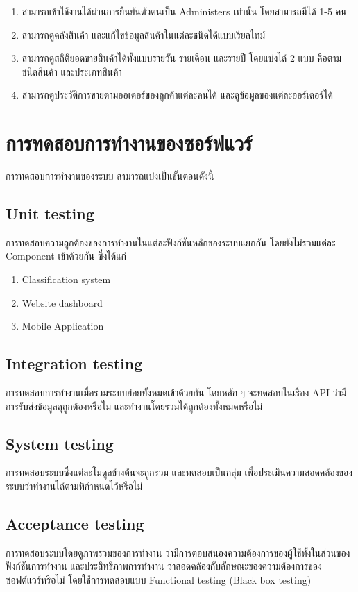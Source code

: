 \begin{enumerate}
  \item สามารถเข้าใช้งานได้ผ่านการยืนยันตัวตนเป็น Administers เท่านั้น โดยสามารถมีได้ 1-5 คน
  \item สามารถดูคลังสินค้า และแก้ไขข้อมูลสินค้าในแต่ละชนิดได้แบบเรียลไทม์
  \item สามารถดูสถิติยอดขายสินค้าได้ทั้งแบบรายวัน รายเดือน และรายปี โดยแบ่งได้ 2 แบบ คือตามชนิดสินค้า และประเภทสินค้า
  \item สามารถดูประวัติการขายตามออเดอร์ของลูกค้าแต่ละคนได้ และดูข้อมูลของแต่ละออร์เดอร์ได้
\end{enumerate}





\section{การทดสอบการทำงานของซอร์ฟแวร์}
การทดสอบการทำงานของระบบ สามารถแบ่งเป็นขั้นตอนดังนี้
\subsection{Unit testing}
การทดสอบความถูกต้องของการทำงานในแต่ละฟังก์ชันหลักของระบบแยกกัน โดยยังไม่รวมแต่ละ Component เข้าด้วยกัน ซึ่งได้แก่
\begin{enumerate}
  \item Classification system
  \item Website dashboard
  \item Mobile Application
\end{enumerate}

\subsection{Integration testing}
การทดสอบการทำงานเมื่อรวมระบบย่อยทั้งหมดเข้าด้วยกัน โดยหลัก ๆ
จะทดสอบในเรื่อง API ว่ามีการรับส่งข้อมูลดุถูกต้องหรือไม่ และทำงานโดยรวมได้ถูกต้องทั้งหมดหรือไม่
\subsection{System testing}
การทดสอบระบบซึ่งแต่ละโมดูลข้างต้นจะถูกรวม และทดสอบเป็นกลุ่ม
เพื่อประเมินความสอดคล้องของระบบว่าทำงานได้ตามที่กำหนดไว้หรือไม่
\subsection{Acceptance testing}
การทดสอบระบบโดยดูภาพรวมของการทำงาน ว่ามีการตอบสนองความต้องการของผู้ใช้ทั้งในส่วนของฟังก์ชันการทำงาน
และประสิทธิภาพการทำงาน ว่าสอดคล้องกับลักษณะของความต้องการของซอฟต์แวร์หรือไม่
โดยใช้การทดสอบแบบ Functional testing (Black box testing)



